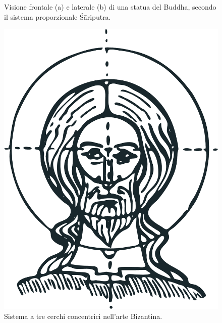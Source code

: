 \begin{figure}
\centering
{} \quad
{}
\caption{Visione frontale (a) e laterale (b) di una statua del Buddha, secondo il sistema proporzionale Śāriputra.}
\label{fig:sariputra_buddha}
\end{figure}

\begin{figure}
 \centering
 \includegraphics[width=.4\textwidth]{./images/byzantin_canon.pdf}
 \caption{Sistema a tre cerchi concentrici nell'arte Bizantina.}
 \label{fig:byzantin_canon}
\end{figure}

